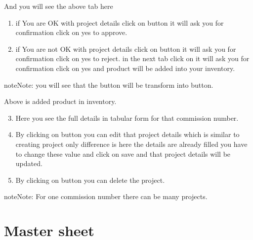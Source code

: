 \documentclass[letterpaper,10pt,english]{sphinxmanual}
\begin{document}
And you will see the above tab here
\begin{enumerate}
\item {} 
if You are OK with project details click on  button it will ask you for confirmation click on yes to approve.

\item {} 
if You are not OK with project details click on  button it will ask you for confirmation click on yes to reject. in the next tab click on  it will ask you for confirmation click on yes and product will be added into your inventory.

\end{enumerate}

\begin{sphinxadmonition}{note}{Note:}
you will see that the  button will be transform into  button.
\end{sphinxadmonition}

\begin{figure}[htbp]
\centering

\noindent{}
\end{figure}

Above is added product in inventory.
\begin{enumerate}
\setcounter{enumi}{2}
\item {} 
Here you see the full details in tabular form for that commission number.

\item {} 
By clicking on  button you can edit that project details which is similar to creating project only difference is here the details are already filled you have to change these value and click on save and that project details will be updated.

\item {} 
By clicking on  button you can delete the project.

\end{enumerate}

\begin{sphinxadmonition}{note}{Note:}
For one commission number there can be many projects.
\end{sphinxadmonition}


\chapter{Master sheet}
\label{\detokenize{mastersheet:master-sheet}}\label{\detokenize{mastersheet::doc}}
\begin{figure}[htbp]
\centering

\noindent{}
\end{figure}
\end{document}
